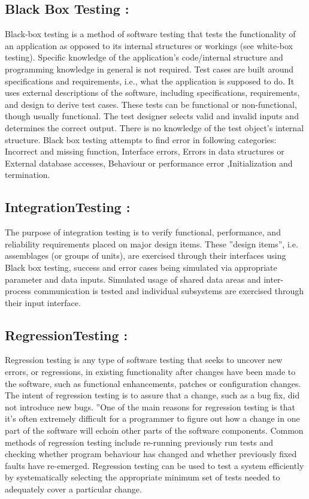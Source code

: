 \documentclass[oneside,a4paper,12pt]{report}
\begin{document}
{\subsection{Black Box Testing : }
Black-box testing is a method of software testing that tests the functionality of an application as opposed to its internal structures or workings (see white-box testing). Specific knowledge of the application’s code/internal structure and programming knowledge in general is not required. Test cases are built around specifications and requirements, i.e., what the application is supposed to do. It uses external descriptions of the software, including specifications, requirements, and design to derive test cases. These tests can be functional or non-functional, though usually functional. The test designer selects valid and invalid inputs and determines the correct output. There is no knowledge of the test object’s internal structure. Black box testing attempts to find error in following categories: Incorrect and missing function, Interface errors, Errors in data structures or External database accesses, Behaviour or performance error ,Initialization and termination.

\subsection{IntegrationTesting : }
The purpose of integration testing is to verify functional, performance, and reliability requirements placed on major design items. These ”design items”, i.e. assemblages (or groups of units), are exercised through their interfaces using Black box testing, success and error cases being simulated via appropriate parameter and data inputs. Simulated usage of shared data areas and inter-process communication is tested and individual subsystems are exercised through their input interface.

\subsection{RegressionTesting : }
Regression testing is any type of software testing that seeks to uncover new errors, or regressions, in existing functionality after changes have been made to the software, such as functional enhancements, patches or configuration changes. The intent of regression testing is to assure that a change, such as a bug fix, did not introduce new bugs. ”One of the main reasons for regression testing is that it’s often extremely difficult for a programmer to figure out how a change in one part of the software will echoin other parts of the software components. Common methods of regression testing include re-running previously run tests and checking whether program behaviour has changed and whether previously fixed faults have re-emerged. Regression testing can be used to test a system efficiently by systematically selecting the appropriate minimum set of tests needed to adequately cover a particular change.

}
\end{document}
